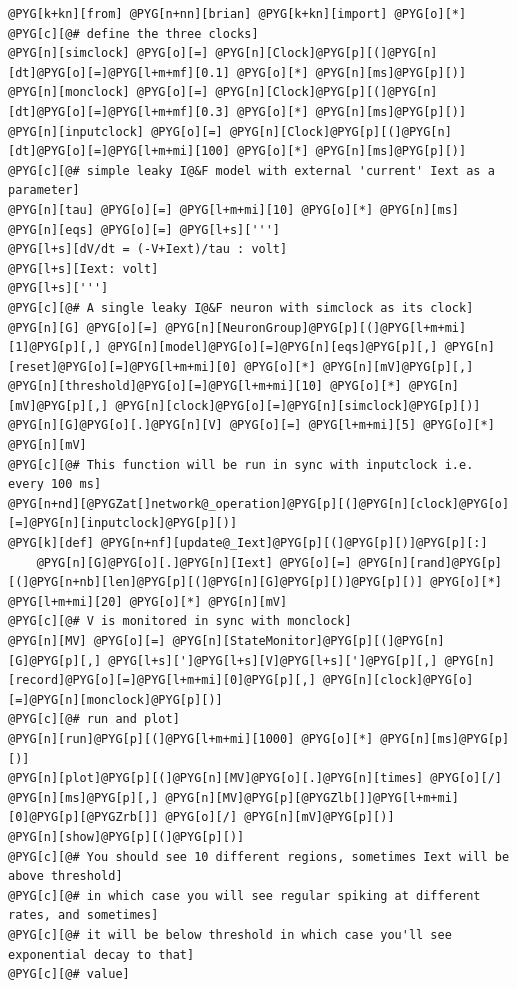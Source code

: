 \documentclass[letterpaper,10pt,english]{manual}
\begin{document}
\begin{Verbatim}[commandchars=@\[\]]
@PYG[k+kn][from] @PYG[n+nn][brian] @PYG[k+kn][import] @PYG[o][*]
@PYG[c][@# define the three clocks]
@PYG[n][simclock] @PYG[o][=] @PYG[n][Clock]@PYG[p][(]@PYG[n][dt]@PYG[o][=]@PYG[l+m+mf][0.1] @PYG[o][*] @PYG[n][ms]@PYG[p][)]
@PYG[n][monclock] @PYG[o][=] @PYG[n][Clock]@PYG[p][(]@PYG[n][dt]@PYG[o][=]@PYG[l+m+mf][0.3] @PYG[o][*] @PYG[n][ms]@PYG[p][)]
@PYG[n][inputclock] @PYG[o][=] @PYG[n][Clock]@PYG[p][(]@PYG[n][dt]@PYG[o][=]@PYG[l+m+mi][100] @PYG[o][*] @PYG[n][ms]@PYG[p][)]
@PYG[c][@# simple leaky I@&F model with external 'current' Iext as a parameter]
@PYG[n][tau] @PYG[o][=] @PYG[l+m+mi][10] @PYG[o][*] @PYG[n][ms]
@PYG[n][eqs] @PYG[o][=] @PYG[l+s][''']
@PYG[l+s][dV/dt = (-V+Iext)/tau : volt]
@PYG[l+s][Iext: volt]
@PYG[l+s][''']
@PYG[c][@# A single leaky I@&F neuron with simclock as its clock]
@PYG[n][G] @PYG[o][=] @PYG[n][NeuronGroup]@PYG[p][(]@PYG[l+m+mi][1]@PYG[p][,] @PYG[n][model]@PYG[o][=]@PYG[n][eqs]@PYG[p][,] @PYG[n][reset]@PYG[o][=]@PYG[l+m+mi][0] @PYG[o][*] @PYG[n][mV]@PYG[p][,] @PYG[n][threshold]@PYG[o][=]@PYG[l+m+mi][10] @PYG[o][*] @PYG[n][mV]@PYG[p][,] @PYG[n][clock]@PYG[o][=]@PYG[n][simclock]@PYG[p][)]
@PYG[n][G]@PYG[o][.]@PYG[n][V] @PYG[o][=] @PYG[l+m+mi][5] @PYG[o][*] @PYG[n][mV]
@PYG[c][@# This function will be run in sync with inputclock i.e. every 100 ms]
@PYG[n+nd][@PYGZat[]network@_operation]@PYG[p][(]@PYG[n][clock]@PYG[o][=]@PYG[n][inputclock]@PYG[p][)]
@PYG[k][def] @PYG[n+nf][update@_Iext]@PYG[p][(]@PYG[p][)]@PYG[p][:]
    @PYG[n][G]@PYG[o][.]@PYG[n][Iext] @PYG[o][=] @PYG[n][rand]@PYG[p][(]@PYG[n+nb][len]@PYG[p][(]@PYG[n][G]@PYG[p][)]@PYG[p][)] @PYG[o][*] @PYG[l+m+mi][20] @PYG[o][*] @PYG[n][mV]
@PYG[c][@# V is monitored in sync with monclock]
@PYG[n][MV] @PYG[o][=] @PYG[n][StateMonitor]@PYG[p][(]@PYG[n][G]@PYG[p][,] @PYG[l+s][']@PYG[l+s][V]@PYG[l+s][']@PYG[p][,] @PYG[n][record]@PYG[o][=]@PYG[l+m+mi][0]@PYG[p][,] @PYG[n][clock]@PYG[o][=]@PYG[n][monclock]@PYG[p][)]
@PYG[c][@# run and plot]
@PYG[n][run]@PYG[p][(]@PYG[l+m+mi][1000] @PYG[o][*] @PYG[n][ms]@PYG[p][)]
@PYG[n][plot]@PYG[p][(]@PYG[n][MV]@PYG[o][.]@PYG[n][times] @PYG[o][/] @PYG[n][ms]@PYG[p][,] @PYG[n][MV]@PYG[p][@PYGZlb[]]@PYG[l+m+mi][0]@PYG[p][@PYGZrb[]] @PYG[o][/] @PYG[n][mV]@PYG[p][)]
@PYG[n][show]@PYG[p][(]@PYG[p][)]
@PYG[c][@# You should see 10 different regions, sometimes Iext will be above threshold]
@PYG[c][@# in which case you will see regular spiking at different rates, and sometimes]
@PYG[c][@# it will be below threshold in which case you'll see exponential decay to that]
@PYG[c][@# value]
\end{Verbatim}
\end{document}
